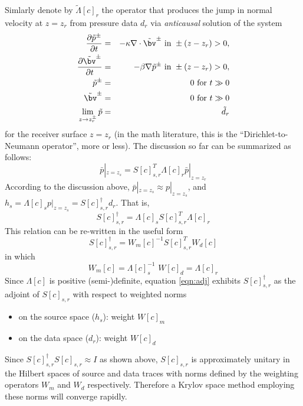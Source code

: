 Simlarly denote by $\tilde{\Lambda}[c]_r$ the operator that produces the jump in normal velocity at $z=z_r$ from pressure data $d_r$ via {\em anticausal} solution of the system 
\begin{eqnarray}
\label{eqn:awebdrytr}
\frac{\partial {\tilde p}^{\pm}}{\partial t} & = & - \kappa \nabla \cdot {\tilde \bv}^{\pm} \mbox{ in } \pm(z-z_r) > 0, \nonumber \\
\frac{\partial {\tilde \bv}^{\pm}}{\partial t} & = & - \beta \nabla {\tilde p}^{\pm} \mbox{ in } \pm(z-z_r) > 0,\nonumber \\
{\tilde p}^{\pm} & =& 0 \mbox{ for } t \gg 0\nonumber\\ 
{\tilde \bv}^{\pm} & = & 0 \mbox{ for } t \gg 0 \nonumber\\
\lim_{z\rightarrow z_r^{\pm}}{\tilde p} & = & {\tilde d}_r 
\end{eqnarray}
 for the receiver surface $z=z_r$ (in the math literature, this is the ``Dirichlet-to-Neumann operator'', more or less). The discussion so far can be summarized as follows:
\begin{equation}
\label{eqn:wadj}
\bar{p}|_{z=z_s} = S[c]_{s,r}^T\Lambda[c]_r \bar{p}|_{z=z_r} 
\end{equation}
According to the discussion above, $\bar{p}|_{z=z_s} \approx p|_{z=z_s}$, and $h_s = \Lambda[c]_s p|_{z=z_s} = S[c]_{s,r}^{\dagger}d_r$. That is,
\begin{equation}
\label{eqn:appinv}
S[c]_{s,r}^{\dagger} = \Lambda[c]_s S[c]_{s,r}^T \Lambda[c]_r
\end{equation}
This relation can be re-written in the useful form
\begin{equation}
\label{eqn:adj}
S[c]_{s,r}^{\dagger} = W_m[c]^{-1}S[c]_{s,r}^TW_d[c]
\end{equation}
in which 
\begin{equation}
\label{eqn:weights}
W_m[c] = \Lambda[c]_s^{-1}\,\, W[c]_d = \Lambda[c]_r
\end{equation}
Since $\Lambda[c]$ is positive (semi-)definite, equation \ref{eqn:adj} exhibits $S[c]_{s,r}^{\dagger}$ as the adjoint of $S[c]_{s,r}$ with respect to weighted norms 
\begin{itemize}
\item on the source space ($h_s$): weight $W[c]_m$
\item on the data space ($d_r$): weight $W[c]_d$
\end{itemize}
Since $S[c]_{s,r}^{\dagger}S[c]_{s,r} \approx I$ as shown above, $S[c]_{s,r}$ is approximately unitary in the Hilbert spaces of source and data traces with norms defined by the weighting operators $W_m$ and $W_d$ respectively. Therefore a Krylov space method employing these norms will converge rapidly.

